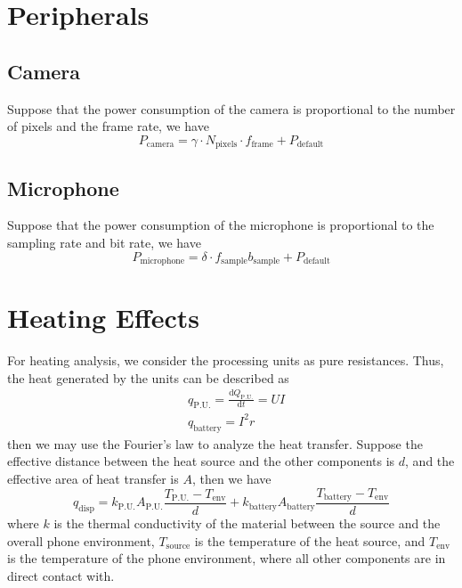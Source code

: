 \documentclass[12pt]{article}
\begin{document}
\section{Peripherals}

\subsection{Camera}

Suppose that the power consumption of the camera is proportional to the number of pixels and the frame rate, we have
\begin{equation}
	P_\mathrm{camera}=\gamma\cdot N_\mathrm{pixels}\cdot f_\mathrm{frame}+P_\mathrm{default}
\end{equation}

\subsection{Microphone}

Suppose that the power consumption of the microphone is proportional to the sampling rate and bit rate, we have
\begin{equation}
	P_\mathrm{microphone}=\delta\cdot f_\mathrm{sample}b_\mathrm{sample}+P_\mathrm{default}
\end{equation}

\section{Heating Effects}

For heating analysis, we consider the processing units as pure resistances. Thus, the heat generated by the units can be described as 
\begin{eqnarray}
	& q_\mathrm{P.U.}=\frac{\mathrm dQ_\mathrm{P.U.}}{\mathrm dt}=UI\\
	& q_\mathrm{battery}=I^2r
\end{eqnarray}
then we may use the Fourier's law to analyze the heat transfer. Suppose the effective distance between the heat source and the other components is $d$, and the effective area of heat transfer is $A$, then we have
\begin{equation}
	q_\mathrm{disp}=k_\mathrm {P.U.}A_\mathrm{P.U.}\frac{T_\mathrm{P.U.}-T_\mathrm{env}}{d}+k_\mathrm {battery}A_\mathrm{battery}\frac{T_\mathrm{battery}-T_\mathrm{env}}{d}
\end{equation}
where $k$ is the thermal conductivity of the material between the source and the overall phone environment, $T_\mathrm{source}$ is the temperature of the heat source, and $T_\mathrm{env}$ is the temperature of the phone environment, where all other components are in direct contact with.
\end{document}
